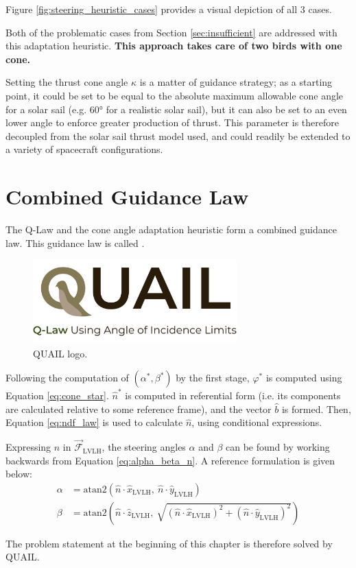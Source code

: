 
Figure \ref{fig:steering_heuristic_cases} provides a visual depiction of all 3 cases.



Both of the problematic cases from Section \ref{sec:insufficient} are addressed with this adaptation heuristic. \textbf{This approach takes care of two birds with one cone.}

Setting the thrust cone angle \(\kappa\) is a matter of guidance strategy; as a starting point, it could be set to be equal to the absolute maximum allowable cone angle for a solar sail (e.g. \ang{60} for a realistic solar sail), but it can also be set to an even lower angle to enforce greater production of thrust. This parameter is therefore decoupled from the solar sail thrust model used, and could readily be extended to a variety of spacecraft configurations.

\section{Combined Guidance Law}
The Q-Law and the cone angle adaptation heuristic form a combined guidance law. This guidance law is called .

\begin{figure}[H]
  \centering
  \includegraphics[width=0.7\textwidth]{figures/quail_logo_v2.pdf}
  \caption{QUAIL logo.}
  \label{fig:quail_logo}
\end{figure}

Following the computation of \((\alpha^*, \beta^*)\) by the first stage, \(\varphi^*\) is computed using Equation \ref{eq:cone_star}. \(\hat{n}^*\) is computed in referential form (i.e. its components are calculated relative to some reference frame), and the vector \(\hat{b}\) is formed. Then, Equation \ref{eq:ndf_law} is used to calculate \(\hat{n}\), using conditional expressions.

Expressing \(\hat{n}\) in \(\vec{\mathcal{F}}_{\text{LVLH}}\), the steering angles \(\alpha\) and \(\beta\) can be found by working backwards from Equation \ref{eq:alpha_beta_n}. A reference formulation is given below:
\begin{align*}
  \alpha & = \mathrm{atan2}\left(\hat{n} \cdot \hat{x}_{\text{LVLH}}, \ \hat{n} \cdot \hat{y}_{\text{LVLH}}\right)                                                      \\
  \beta  & = \mathrm{atan2}\left(\hat{n} \cdot \hat{z}_{\text{LVLH}}, \ \sqrt{(\hat{n} \cdot \hat{x}_{\text{LVLH}})^2 + (\hat{n} \cdot \hat{y}_{\text{LVLH}})^2}\right)
\end{align*}

The problem statement at the beginning of this chapter is therefore solved by QUAIL.